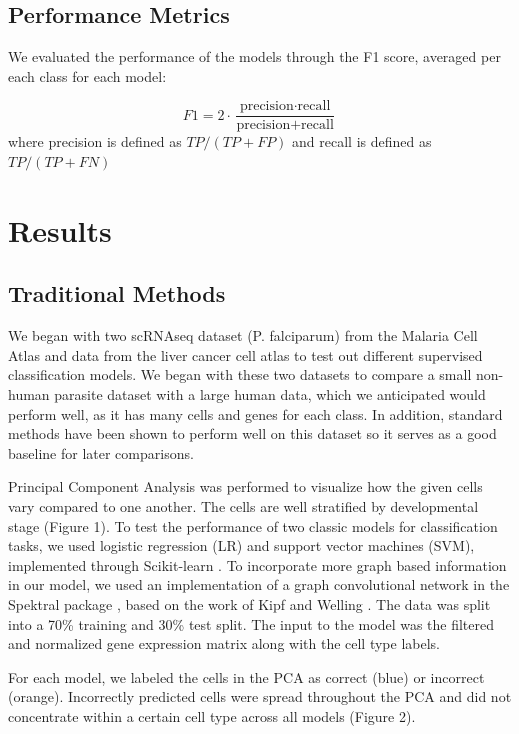 \documentclass{article}
\begin{document}
\subsection{Performance Metrics}

We evaluated the performance of the models through the F1 score, averaged per each class for each model:

$$
F1 = 2 \cdot \frac{\text{precision} \cdot \text{recall}}{\text{precision} + \text{recall}}
$$
where precision is defined as $TP/(TP + FP)$ and recall is defined as $TP/(TP + FN)$

\section{Results}

\subsection{Traditional Methods}

We began with two scRNAseq dataset (P. falciparum) from the Malaria Cell Atlas \cite{howickMalariaCellAtlas2019} and data from the liver cancer cell atlas \cite{maSinglecellAtlasTumor2021} to test out different supervised classification models. We began with these two datasets to compare a small non-human parasite dataset with a large human data, which we anticipated would perform well, as it has many cells and genes for each class. In addition, standard methods have been shown to perform well on this dataset \cite{shuklaSupervisedLearningPlasmodium2023} so it serves as a good baseline for later comparisons. 

Principal Component Analysis was performed to visualize how the given cells vary compared to one another. The cells are well stratified by developmental stage (Figure 1). To test the performance of two classic models for classification tasks, we used logistic regression (LR) and support vector machines (SVM), implemented through Scikit-learn \cite{pedregosaScikitlearnMachineLearning2011}. To incorporate more graph based information in our model, we used an implementation of a graph convolutional network in the Spektral package \cite{grattarolaGraphNeuralNetworks2020}, based on the work of Kipf and Welling \cite{kipfSemiSupervisedClassificationGraph2017}. The data was split into a 70\% training and 30\% test split. The input to the model was the filtered and normalized gene expression matrix along with the cell type labels.

For each model, we labeled the cells in the PCA as correct (blue) or incorrect (orange). Incorrectly predicted cells were spread throughout the PCA and did not concentrate within a certain cell type across all models (Figure 2). 
\end{document}
